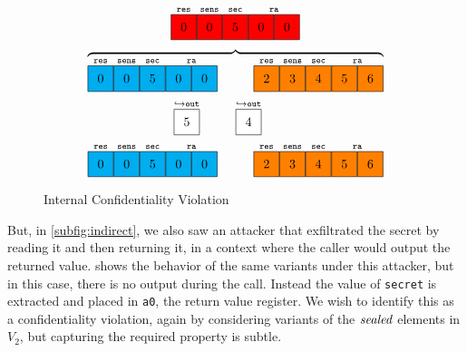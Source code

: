\documentclass[10pt,conference]{ieeetran}%
\theoremstyle{definition}
\begin{document}
\begin{figure}
    \centering
    \[
    \stackrel{\texttt{res}}{\figfourbox[0]}
    \stackrel{\texttt{sens}}{\figfourbox[0]}
    \stackrel{\texttt{sec}}{\figfourbox[5]}
    \stackrel{\texttt{ra}}{\figfourbox[0]\figfourbox[0]}\]
    \[\overbrace{
    \stackrel{\texttt{res}}{\leftbox[0]}
    \stackrel{\texttt{sens}}{\leftbox[0]}
    \stackrel{\texttt{sec}}{\leftbox[5]}
    \stackrel{\texttt{ra}}{\leftbox[0]\leftbox[0]}
    \hspace{1cm}
    \stackrel{\texttt{res}}{\rightbox[2]}
    \stackrel{\texttt{sens}}{\rightbox[3]}
    \stackrel{\texttt{sec}}{\rightbox[4]}
    \stackrel{\texttt{ra}}{\rightbox[5]\rightbox[6]}}
    \]
    \[%
    \stackrel{\hookrightarrow \mathtt{out}}{\genbox{20px}{white}{5}} \hspace{0.5cm}
    \hspace{0.5cm}
    \stackrel{\hookrightarrow \mathtt{out}}{\genbox{20px}{white}{4}} \hspace{1cm}
    \]
    \[
    \stackrel{\texttt{res}}{\leftbox[0]}
    \stackrel{\texttt{sens}}{\leftbox[0]}
    \stackrel{\texttt{sec}}{\leftbox[5]}
    \stackrel{\texttt{ra}}{\leftbox[0]\leftbox[0]}
    \hspace{1cm}
    \stackrel{\texttt{res}}{\rightbox[2]}
    \stackrel{\texttt{sens}}{\rightbox[3]}
    \stackrel{\texttt{sec}}{\rightbox[4]}
    \stackrel{\texttt{ra}}{\rightbox[5]\rightbox[6]}
    \]

  \caption{Internal Confidentiality Violation}
  \label{fig:variant2}
\end{figure}

But, in \cref{subfig:indirect}, we also saw an attacker that exfiltrated the secret
by reading it and then returning it, in a context where the caller would output the returned
value.  shows the behavior of the same variants under this attacker,
but in this case, there is no output during the call. Instead the value of {\tt secret} is
extracted and placed in {\tt a0}, the return value register. We wish to identify this as
a confidentiality violation, again by considering variants of the \(\mathit{sealed}\)
elements in \(V_2\), but capturing the required property is subtle.
\end{document}
